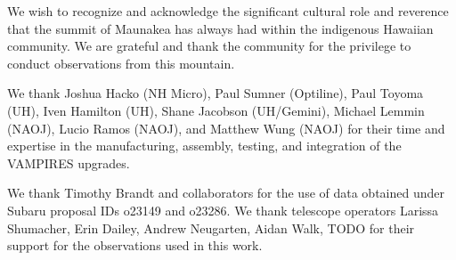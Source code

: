\begin{acknowledgements}
We wish to recognize and acknowledge the significant cultural role and reverence that the summit of Maunakea has always had within the indigenous Hawaiian community. We are grateful and thank the community for the privilege to conduct observations from this mountain.

We thank Joshua Hacko (NH Micro), Paul Sumner (Optiline), Paul Toyoma (UH), Iven Hamilton (UH), Shane Jacobson (UH/Gemini), Michael Lemmin (NAOJ), Lucio Ramos (NAOJ), and Matthew Wung (NAOJ) for their time and expertise in the manufacturing, assembly, testing, and integration of the VAMPIRES upgrades.

We thank Timothy Brandt and collaborators for the use of data obtained under Subaru proposal IDs o23149 and o23286. We thank telescope operators Larissa Shumacher, Erin Dailey, Andrew Neugarten, Aidan Walk, TODO for their support for the observations used in this work.
\end{acknowledgements}